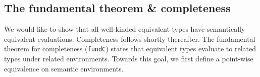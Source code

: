 \documentclass[authoryear, acmsmall, screen, review, nonacm]{acmart}
\begin{document}
\subsection{The fundamental theorem \& completeness}

We would like to show that all well-kinded equivalent types have semantically equivalent evaluations. Completeness follows shortly thereafter. The fundamental theorem for completeness (\verb!fundC!) states that equivalent types evaluate to related types under related environments. Towards this goal, we first define a point-wise equivalence on semantic environments.

\begin{code}%
\>[0]\AgdaSpace{}%
\AgdaSymbol{:}\AgdaSpace{}%
\AgdaSymbol{(}\AgdaSpace{}%
\AgdaSpace{}%
\AgdaSymbol{:}\AgdaSpace{}%
\AgdaSpace{}%
\AgdaSpace{}%
\AgdaSymbol{)}\AgdaSpace{}%
\AgdaSpace{}%
\<%
\\
\>[0]\AgdaSpace{}%
\AgdaSpace{}%
\AgdaSpace{}%
\AgdaSymbol{=}\AgdaSpace{}%
\AgdaSpace{}%
\AgdaSymbol{\{}\AgdaSymbol{\}}\AgdaSpace{}%
\AgdaSymbol{(}\AgdaSpace{}%
\AgdaSymbol{:}\AgdaSpace{}%
\AgdaSpace{}%
\AgdaSymbol{\AgdaUnderscore{}}\AgdaSpace{}%
\AgdaSymbol{)}\AgdaSpace{}%
\AgdaSpace{}%
\AgdaSymbol{(}\AgdaSpace{}%
\AgdaSymbol{)}\AgdaSpace{}%
\AgdaSpace{}%
\AgdaSymbol{(}\AgdaSpace{}%
\AgdaSymbol{)}\<%
\end{code}
\end{document}
